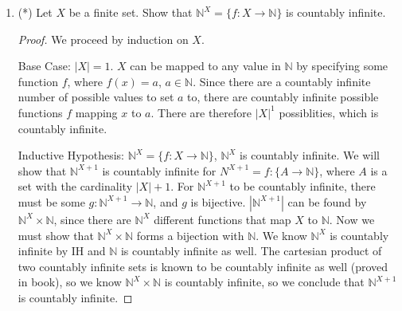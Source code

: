 \documentclass[12pt]{article}
\newcommand{\N}{\mathbb{N}}
\begin{document}
\begin{enumerate}
\begin{proof}
Assume $X$ is countably infinite. So there exists a bijection $g:\N \to X$. We can therefore create a composition $g \circ f:\N \to Y$. Since there exists a bijection from the naturals to $Y$, we conclude $Y$ is countably infinite.

Assume $Y$ is countably infinite. So there exists $f^{-1}: Y \to X$. Since $Y$ is countably infinite, there is a function $g:\N \to Y$. So if we take $f^-1 \circ g: \N \to X$, there is clearly a bijection between the natural numbers and $X$, so it is countably infinite.  
\end{proof}

\item (*) Let $X$ be a finite set. Show that $\N^X=\{f:X\to \N\}$ is countably infinite.

\begin{proof}
We proceed by induction on $X$. 

Base Case: $|X| = 1$. $X$ can be mapped to any value in $\N$ by specifying some function $f$, where $f(x) = a$, $a \in \N$. Since there are a countably infinite number of possible values to set $a$ to, there are countably infinite possible functions $f$ mapping $x$ to $a$. There are therefore $|X|^1$ possiblities, which is countably infinite. 

Inductive Hypothesis: $\N^X=\{f:X\to \N\}$, $\N^X$ is countably infinite. We will show that $\N^{X + 1}$ is countably infinite for $N^{X + 1} = f:\{A \to \N\}$, where $A$ is a set with the cardinality $|X| + 1$. For $\N^{X + 1}$ to be countably infinite, there must be some $g:\N^{X + 1} \to \N$, and $g$ is bijective. $|\N^{X + 1}|$ can be found by $\N^X \times \N$, since there are $\N^X$ different functions that map $X$ to $\N$. Now we must show that $\N^X \times \N$ forms a bijection with $\N$. We know $\N^X$ is countably infinite by IH and $\N$ is countably infinite as well. The cartesian product of two countably infinite sets is known to be countably infinite as well (proved in book), so we know $\N^X \times \N$ is countably infinite, so we conclude that $\N^{X + 1}$ is countably infinite.  
\end{proof}

\end{enumerate}
\end{document}
